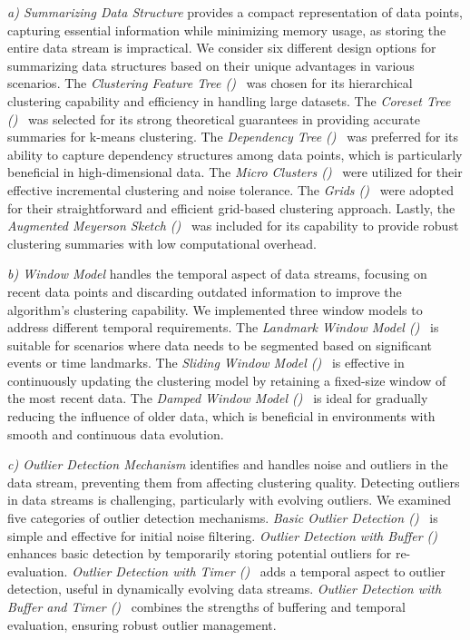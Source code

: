 \textit{a) Summarizing Data Structure} provides a compact representation of data points, capturing essential information while minimizing memory usage, as storing the entire data stream is impractical. We consider six different design options for summarizing data structures based on their unique advantages in various scenarios. The \emph{Clustering Feature Tree (\CFT)}~\cite{zhang1997birch} was chosen for its hierarchical clustering capability and efficiency in handling large datasets. The \emph{Coreset Tree (\CoreT)}~\cite{StreamKM++:12} was selected for its strong theoretical guarantees in providing accurate summaries for k-means clustering. The \emph{Dependency Tree (\DPT)}~\cite{EDMStream:17} was preferred for its ability to capture dependency structures among data points, which is particularly beneficial in high-dimensional data. The \emph{Micro Clusters (\MCs)}~\cite{Clustream:03} were utilized for their effective incremental clustering and noise tolerance. The \emph{Grids (\Grids)}~\cite{DStream:2007} were adopted for their straightforward and efficient grid-based clustering approach. Lastly, the \emph{Augmented Meyerson Sketch (\MS)}~\cite{SL-KMeans:20} was included for its capability to provide robust clustering summaries with low computational overhead.

\textit{b) Window Model} handles the temporal aspect of data streams, focusing on recent data points and discarding outdated information to improve the algorithm's clustering capability. We implemented three window models to address different temporal requirements. The \emph{Landmark Window Model (\landmark)}~\cite{StreamKM++:12} is suitable for scenarios where data needs to be segmented based on significant events or time landmarks. The \emph{Sliding Window Model (\sliding)}~\cite{SL-KMeans:20} is effective in continuously updating the clustering model by retaining a fixed-size window of the most recent data. The \emph{Damped Window Model (\damped)}~\cite{DenStream:06, DBStream:16, DStream:2007} is ideal for gradually reducing the influence of older data, which is beneficial in environments with smooth and continuous data evolution.

\textit{c) Outlier Detection Mechanism} identifies and handles noise and outliers in the data stream, preventing them from affecting clustering quality. Detecting outliers in data streams is challenging, particularly with evolving outliers. We examined five categories of outlier detection mechanisms. \emph{Basic Outlier Detection (\od)}~\cite{BIRCH:96} is simple and effective for initial noise filtering. \emph{Outlier Detection with Buffer (\buffer)}~\cite{Clustream:03} enhances basic detection by temporarily storing potential outliers for re-evaluation. \emph{Outlier Detection with Timer (\timer)}~\cite{DStream:2007, DBStream:16} adds a temporal aspect to outlier detection, useful in dynamically evolving data streams. \emph{Outlier Detection with Buffer and Timer (\buffertimer)}~\cite{DenStream:06, EDMStream:17} combines the strengths of buffering and temporal evaluation, ensuring robust outlier management.

